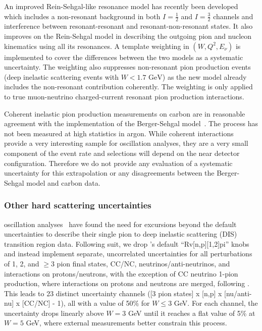 An improved Rein-Sehgal-like resonance model has recently been developed~\cite{minoo} which includes a non-resonant background in both $I=\frac{1}{2}$ and $I=\frac{3}{2}$ channels and interference between resonant-resonant and resonant-non-resonant states. %
It also improves on the Rein-Sehgal model in describing the outgoing pion and nucleon kinematics using all its resonances.
A template weighting in $(W, Q^2, E_\nu)$ is implemented to cover the differences between the two models as a systematic uncertainty. The weighting also suppresses  non-resonant pion production events (deep inelastic scattering events with $W<1.7\text{ GeV}$) as the new model already includes the non-resonant contribution coherently. %
The weighting is only applied to true muon-neutrino charged-current resonant pion production interactions.

Coherent inelastic pion production measurements on carbon are in reasonable agreement with the  implementation of the Berger-Sehgal model~\cite{Mislivec:2017qfz}.  The process has not been measured at high statistics in argon. While coherent interactions provide a very interesting sample for oscillation analyses, they are a very small component of the event rate and selections will depend on the near detector configuration. Therefore we do not provide any evaluation of a systematic uncertainty for this extrapolation or any disagreements between the Berger-Sehgal model and carbon data.

\subsubsection{Other hard scattering uncertainties}
\nova oscillation analyses~\cite{nova_2018} have found the need for excursions beyond the default  uncertainties to describe their single pion to deep inelastic scattering (DIS) transition region data.  Following suit, we drop 's default ``Rv[n,p][1,2]pi'' knobs and instead implement separate, uncorrelated uncertainties for all perturbations of 1, 2, and $\geq 3$ pion final states, CC/NC, neutrinos/anti-neutrinos, and interactions on protons/neutrons, with the exception of CC neutrino 1-pion production, where interactions on protons and neutrons are merged, following \cite{Rodrigues:2016xjj}. This leads to 23 distinct uncertainty channels ([3 pion states] x [n,p] x [nu/anti-nu] x [CC/NC] - 1), all with a value of 50\% for $W \leq 3$ GeV.  For each channel, the uncertainty drops linearly above $W = 3$ GeV until it reaches a flat value of 5\% at $W = 5$ GeV, where external measurements better constrain this process.

